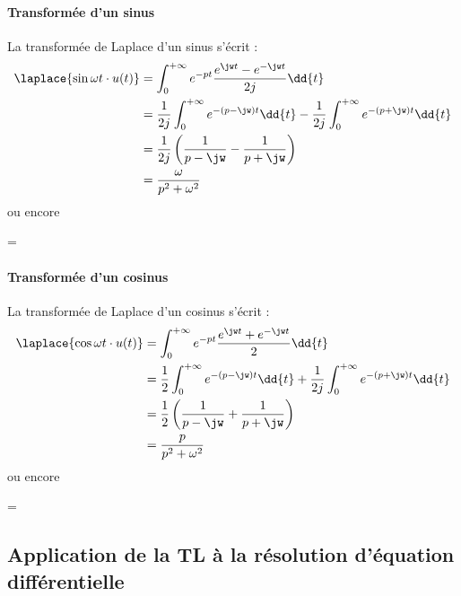 \paragraph{Transformée d'un sinus}
La transformée de Laplace d'un sinus s'écrit :
\begin{align*}
\laplace{\sin{\omega t}\cdot u(t)}&=
\int_{0}^{+\infty}e^{-pt}\dfrac{e^{\jw t}-e^{-\jw t}}{2j}\dd{t}\\
&=\dfrac{1}{2j}\int_{0}^{+\infty}e^{-(p-\jw)t}\dd{t} - 
  \dfrac{1}{2j}\int_{0}^{+\infty}e^{-(p+\jw)t}\dd{t} \\
&=\dfrac{1}{2j}\left( \dfrac{1}{p-\jw}-\dfrac{1}{p+\jw}\right)\\
&=\dfrac{\omega}{p^2+\omega^2}
\end{align*}
ou encore
\begin{bequation}
    =
\end{bequation}

\paragraph{Transformée d'un cosinus}
La transformée de Laplace d'un cosinus s'écrit :
\begin{align*}
\laplace{\cos{\omega t}\cdot u(t)}&=\int_{0}^{+\infty}e^{-pt}
\dfrac{e^{\jw t}+e^{-\jw t}}{2}\dd{t}\\
&=\dfrac{1}{2}\int_{0}^{+\infty}e^{-(p-\jw)t}\dd{t} + 
\dfrac{1}{2j}\int_{0}^{+\infty}e^{-(p+\jw)t}\dd{t} \\
&=\dfrac{1}{2}\left( \dfrac{1}{p-\jw}+\dfrac{1}{p+\jw}\right)\\
&=\dfrac{p}{p^2+\omega^2}
\end{align*}
ou encore
\begin{bequation}
    =
\end{bequation}


\subsection[Application de la transformée de Laplace]
           {Application de la TL à la résolution d'équation différentielle}

